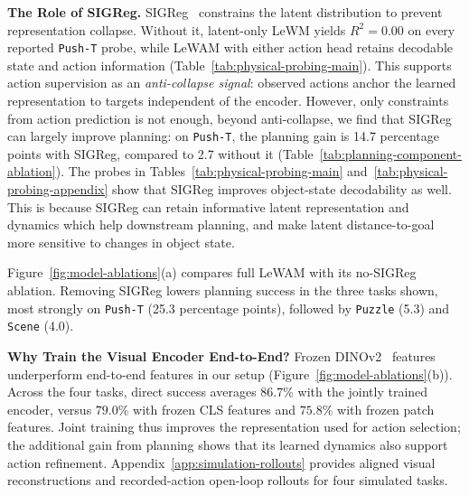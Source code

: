 \documentclass{article} %
\newcommand{\methodname}[1]{\textup{#1}}
\newcommand{\dataset}[1]{\texttt{#1}}
\newcommand{\method}{\methodname{LeWAM}}
\newcommand{\lead}[1]{\textbf{#1}}
\begin{document}
\lead{The Role of SIGReg.} SIGReg~\citep{balestriero2025lejepa,maes2026lewm} constrains the latent distribution to prevent representation collapse. Without it, latent-only LeWM yields $R^2=0.00$ on every reported \dataset{Push-T} probe, while LeWAM with either action head retains decodable state and action information (Table~\ref{tab:physical-probing-main}). This supports action supervision as an \emph{anti-collapse signal}: observed actions anchor the learned representation to targets independent of the encoder.
However, only constraints from action prediction is not enough, beyond anti-collapse, we find that SIGReg can largely improve planning: on \dataset{Push-T}, the planning gain is 14.7 percentage points with SIGReg, compared to 2.7 without it (Table~\ref{tab:planning-component-ablation}). The probes in Tables~\ref{tab:physical-probing-main} and~\ref{tab:physical-probing-appendix} show that SIGReg improves object-state decodability as well. This is because SIGReg can retain informative latent representation and dynamics which help downstream planning, and make latent distance-to-goal more sensitive to changes in object state.


Figure~\ref{fig:model-ablations}(a) compares
full \method{} with its no-SIGReg ablation. Removing SIGReg lowers planning
success in the three tasks shown, most strongly on \dataset{Push-T} (25.3 percentage
points), followed by \dataset{Puzzle} (5.3) and \dataset{Scene} (4.0).

\label{sec:action-refines-representation}
\lead{Why Train the Visual Encoder End-to-End?} Frozen DINOv2~\citep{oquab2023dinov2} features underperform end-to-end features in our setup (Figure~\ref{fig:model-ablations}(b)). Across the four tasks, direct success averages $86.7\%$ with the jointly trained encoder, versus $79.0\%$ with frozen CLS features and $75.8\%$ with frozen patch features. Joint training thus improves the representation used for action selection; the additional gain from planning shows that its learned dynamics also support action refinement.
Appendix~\ref{app:simulation-rollouts} provides aligned visual reconstructions and
recorded-action open-loop rollouts for four simulated tasks.
\end{document}
